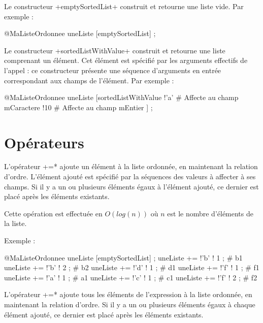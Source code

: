 Le constructeur \ggs+emptySortedList+ construit et retourne une liste vide. Par exemple :
\begin{galgascode}
@MaListeOrdonnee uneListe [emptySortedList] ;
\end{galgascode}



Le constructeur \ggs+sortedListWithValue+ construit et retourne une liste comprenant un élément. Cet élément est spécifié par les arguments effectifs de l'appel : ce constructeur présente une séquence d'arguments en entrée correspondant aux champs de l'élément. Par exemple :

\begin{galgascode}
@MaListeOrdonnee uneListe [sortedListWithValue
  !'a' # Affecte au champ mCaractere
  !10  # Affecte au champ mEntier
] ;
\end{galgascode}






\section{Opérateurs}



L'opérateur \ggs*+=* ajoute un élément à la liste ordonnée, en maintenant la relation d'ordre. L'élément ajouté est spécifié par la séquences des valeurs à affecter à ses champs. Si il y a un ou plusieurs éléments égaux à l'élément ajouté, ce dernier est placé après les éléments existants. 


Cette opération est effectuée en $O(log (n))$ où $n$ est le nombre d'éléments de la liste.

Exemple :

\begin{galgascode}
@MaListeOrdonnee uneListe [emptySortedList] ;
uneListe += !'b' ! 1 ; # b1
uneListe += !'b' ! 2 ; # b2
uneListe += !'d' ! 1 ; # d1
uneListe += !'f' ! 1 ; # f1
uneListe += !'a' ! 1 ; # a1
uneListe += !'c' ! 1 ; # c1
uneListe += !'f' ! 2 ; # f2
\end{galgascode}


L'opérateur \ggs*+=* ajoute tous les éléments de l'expression à la liste ordonnée, en maintenant la relation d'ordre. Si il y a un ou plusieurs éléments égaux à chaque élément ajouté, ce dernier est placé après les éléments existants. 

